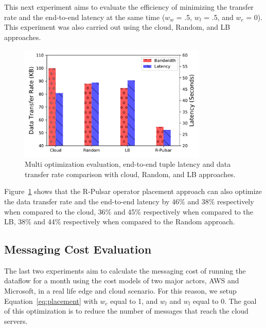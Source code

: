 This next experiment aims to evaluate the efficiency of minimizing the transfer rate and the end-to-end latency at the same time ($w_w$ = .5, $w_l$ = .5, and $w_c$ = 0). This experiment was also carried out using the cloud, Random, and LB approaches.

\begin{figure}
  \centering
  \includegraphics[width=0.8\textwidth]{Results/LandB.pdf}
  \caption{Multi optimization evaluation, end-to-end tuple latency and data transfer rate comparison with cloud, Random, and LB approaches.}
  \label{fig:both}
\end{figure} 

Figure~\ref{fig:both} shows that the R-Pulsar operator placement approach can also optimize the data transfer rate and the end-to-end latency by 46\% and 38\% respectively when compared to the cloud, 36\% and 45\% respectively when compared to the LB, 38\% and 44\% respectively when compared to the Random approach.

\subsection{Messaging Cost Evaluation}

The last two experiments aim to calculate the messaging cost of running the dataflow for a month using the cost models of two major actors, AWS and Microsoft, in a real life edge and cloud scenario. For this reason, we setup Equation~\ref{eq:placement} with $w_c$ equal to 1, and $w_l$ and $w_l$ equal to 0. The goal of this optimization is to reduce the number of messages that reach the cloud servers.

